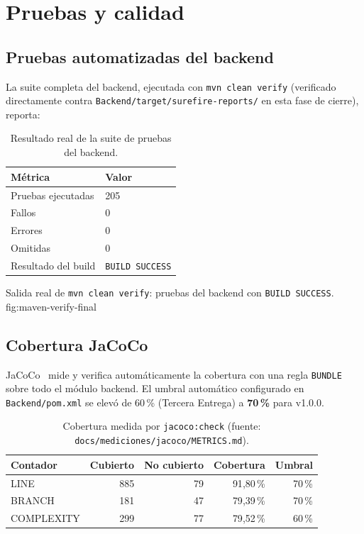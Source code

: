 \chapter{Pruebas y calidad}
\label{cap:pruebas-calidad}

\section{Pruebas automatizadas del backend}

La suite completa del backend, ejecutada con \texttt{mvn clean verify}
(verificado directamente contra \texttt{Backend/target/surefire-reports/}
en esta fase de cierre), reporta:

\begin{table}[H]
  \centering
  \caption{Resultado real de la suite de pruebas del backend.}
  \label{tab:pruebas-final}
  \begin{tabular}{@{}ll@{}}
    \toprule
    M\'etrica & Valor \\
    \midrule
    Pruebas ejecutadas & 205 \\
    Fallos & 0 \\
    Errores & 0 \\
    Omitidas & 0 \\
    Resultado del build & \texttt{BUILD SUCCESS} \\
    \bottomrule
  \end{tabular}
\end{table}

%
{Salida real de \texttt{mvn clean verify}: pruebas del backend con \texttt{BUILD SUCCESS}.}%
{fig:maven-verify-final}

\section{Cobertura JaCoCo}
\label{sec:jacoco-final}

JaCoCo~\cite{jacoco-docs} mide y verifica autom\'aticamente la cobertura
con una regla \texttt{BUNDLE} sobre todo el m\'odulo backend. El umbral
autom\'atico configurado en \texttt{Backend/pom.xml} se elev\'o de 60\,\%
(Tercera Entrega) a \textbf{70\,\%} para v1.0.0.

\begin{table}[H]
  \centering
  \caption{Cobertura medida por \texttt{jacoco:check} (fuente: \texttt{docs/mediciones/jacoco/METRICS.md}).}
  \label{tab:jacoco-final}
  \begin{tabular}{@{}lrrrr@{}}
    \toprule
    Contador & Cubierto & No cubierto & Cobertura & Umbral \\
    \midrule
    LINE & 885 & 79 & 91{,}80\,\% & 70\,\% \\
    BRANCH & 181 & 47 & 79{,}39\,\% & 70\,\% \\
    COMPLEXITY & 299 & 77 & 79{,}52\,\% & 60\,\% \\
    \bottomrule
  \end{tabular}
\end{table}

